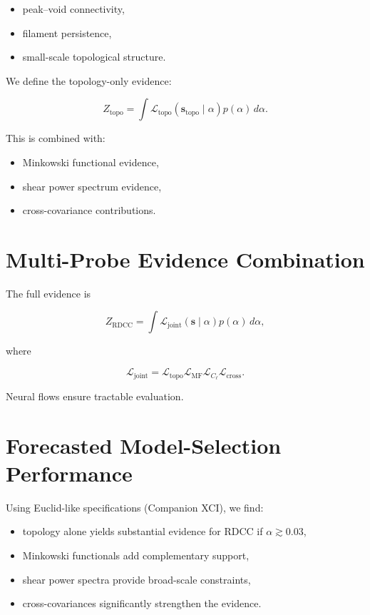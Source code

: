 \documentclass[11pt,a4paper]{article}
\begin{document}
\begin{itemize}
    \item peak–void connectivity,
    \item filament persistence,
    \item small-scale topological structure.
\end{itemize}

We define the topology-only evidence:



\[
    Z_{\mathrm{topo}}
    =
    \int
    \mathcal{L}_{\mathrm{topo}}(\mathbf{s}_{\mathrm{topo}} \mid \alpha)
    p(\alpha)
    \, d\alpha.
\]



This is combined with:

\begin{itemize}
    \item Minkowski functional evidence,
    \item shear power spectrum evidence,
    \item cross-covariance contributions.
\end{itemize}
\section{Multi-Probe Evidence Combination}

The full evidence is



\[
    Z_{\mathrm{RDCC}}
    =
    \int
    \mathcal{L}_{\mathrm{joint}}(\mathbf{s} \mid \alpha)
    p(\alpha)
    \, d\alpha,
\]



where



\[
    \mathcal{L}_{\mathrm{joint}}
    =
    \mathcal{L}_{\mathrm{topo}}
    \mathcal{L}_{\mathrm{MF}}
    \mathcal{L}_{C_{\ell}}
    \mathcal{L}_{\mathrm{cross}}.
\]



Neural flows ensure tractable evaluation.
\section{Forecasted Model-Selection Performance}

Using Euclid-like specifications (Companion XCI), we find:

\begin{itemize}
    \item topology alone yields substantial evidence for RDCC if $\alpha \gtrsim 0.03$,
    \item Minkowski functionals add complementary support,
    \item shear power spectra provide broad-scale constraints,
    \item cross-covariances significantly strengthen the evidence.
\end{itemize}
\end{document}
